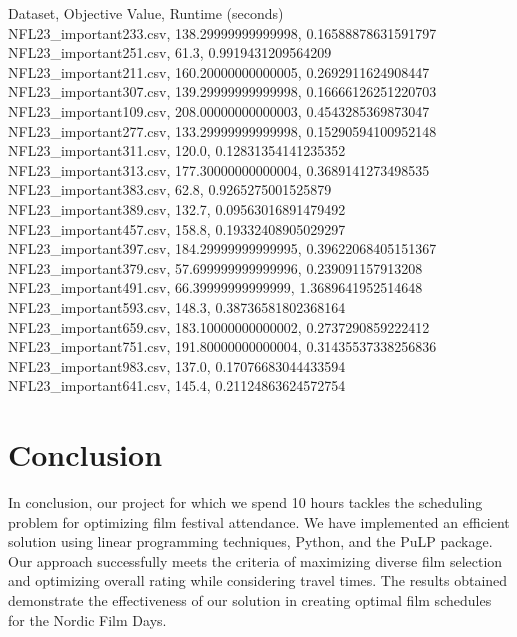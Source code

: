 \documentclass{article}
\begin{document}
Dataset, Objective Value, Runtime (seconds)\\
NFL23\_important233.csv, 138.29999999999998, 0.16588878631591797\\
NFL23\_important251.csv, 61.3, 0.9919431209564209\\
NFL23\_important211.csv, 160.20000000000005, 0.2692911624908447\\
NFL23\_important307.csv, 139.29999999999998, 0.16666126251220703\\
NFL23\_important109.csv, 208.00000000000003, 0.4543285369873047\\
NFL23\_important277.csv, 133.29999999999998, 0.15290594100952148\\
NFL23\_important311.csv, 120.0, 0.12831354141235352\\
NFL23\_important313.csv, 177.30000000000004, 0.3689141273498535\\
NFL23\_important383.csv, 62.8, 0.9265275001525879\\
NFL23\_important389.csv, 132.7, 0.09563016891479492\\
NFL23\_important457.csv, 158.8, 0.19332408905029297\\
NFL23\_important397.csv, 184.29999999999995, 0.39622068405151367\\
NFL23\_important379.csv, 57.699999999999996, 0.239091157913208\\
NFL23\_important491.csv, 66.39999999999999, 1.3689641952514648\\
NFL23\_important593.csv, 148.3, 0.38736581802368164\\
NFL23\_important659.csv, 183.10000000000002, 0.2737290859222412\\
NFL23\_important751.csv, 191.80000000000004, 0.31435537338256836\\
NFL23\_important983.csv, 137.0, 0.17076683044433594\\
NFL23\_important641.csv, 145.4, 0.21124863624572754

\section{Conclusion}
In conclusion, our project for which we spend 10 hours tackles the scheduling problem for optimizing film festival attendance. We have implemented an efficient solution using linear programming techniques, Python, and the PuLP package. Our approach successfully meets the criteria of maximizing diverse film selection and optimizing overall rating while considering travel times. The results obtained demonstrate the effectiveness of our solution in creating optimal film schedules for the Nordic Film Days.
\end{document}

